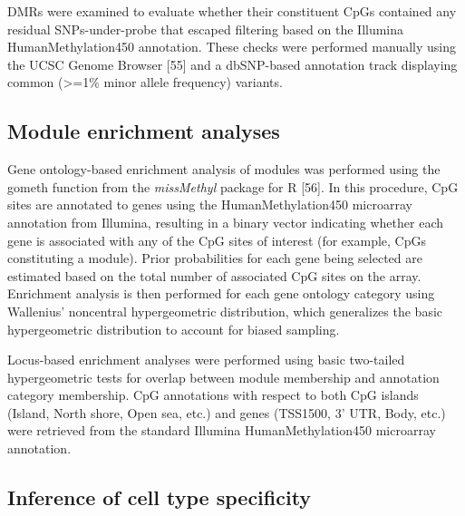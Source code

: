 \documentclass[]{article}
\theoremstyle{definition}
\theoremstyle{definition}
\theoremstyle{definition}
\theoremstyle{remark}
\begin{document}
DMRs were examined to evaluate whether their constituent CpGs contained
any residual SNPs-under-probe that escaped filtering based on the
Illumina HumanMethylation450 annotation. These checks were performed
manually using the UCSC Genome Browser {[}55{]} and a dbSNP-based
annotation track displaying common (\textgreater{}=1\% minor allele
frequency) variants.

\subsection{Module enrichment
analyses}\label{module-enrichment-analyses}

Gene ontology-based enrichment analysis of modules was performed using
the gometh function from the \emph{missMethyl} package for R {[}56{]}.
In this procedure, CpG sites are annotated to genes using the
HumanMethylation450 microarray annotation from Illumina, resulting in a
binary vector indicating whether each gene is associated with any of the
CpG sites of interest (for example, CpGs constituting a module). Prior
probabilities for each gene being selected are estimated based on the
total number of associated CpG sites on the array. Enrichment analysis
is then performed for each gene ontology category using Wallenius'
noncentral hypergeometric distribution, which generalizes the basic
hypergeometric distribution to account for biased sampling.

Locus-based enrichment analyses were performed using basic two-tailed
hypergeometric tests for overlap between module membership and
annotation category membership. CpG annotations with respect to both CpG
islands (Island, North shore, Open sea, etc.) and genes (TSS1500, 3'
UTR, Body, etc.) were retrieved from the standard Illumina
HumanMethylation450 microarray annotation.

\subsection{Inference of cell type
specificity}\label{inference-of-cell-type-specificity}
\end{document}

